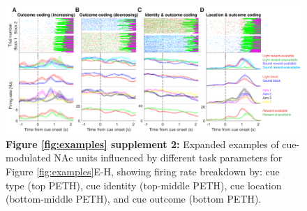 \documentclass[11pt]{article}
\newcommand{\bsf}[1]{\textbf{#1}}
\begin{document}
 \begin{figure}[ht!]
\centering
\includegraphics[width=\textwidth]{Fig 3 - Neural examples SUPP2.pdf}
\caption*{\bsf{Figure \ref{fig:examples} supplement 2:} Expanded examples of cue-modulated NAc units influenced by different
  task parameters for Figure \ref{fig:examples}E-H, showing firing rate breakdown by: cue type (top PETH), cue identity (top-middle PETH), cue location (bottom-middle PETH), and cue outcome (bottom PETH).}
\label{fig:examplesSUPP2}
\end{figure} \clearpage
\end{document}
